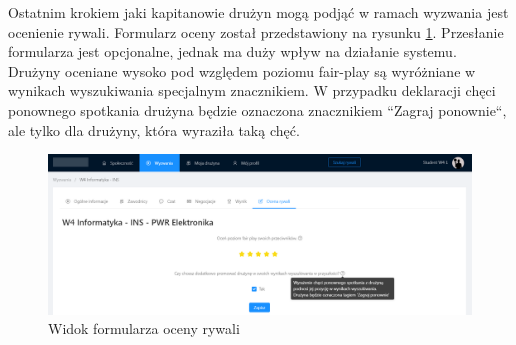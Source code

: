 Ostatnim krokiem jaki kapitanowie drużyn mogą podjąć w ramach wyzwania jest ocenienie rywali. Formularz oceny został przedstawiony na rysunku \ref{fig:ss--match-10}. Przesłanie formularza jest opcjonalne, jednak ma duży wpływ na działanie systemu. Drużyny oceniane wysoko pod względem poziomu fair-play są wyróżniane w wynikach wyszukiwania specjalnym znacznikiem. W przypadku deklaracji chęci ponownego spotkania drużyna będzie oznaczona znacznikiem ``Zagraj ponownie``, ale tylko dla drużyny, która wyraziła taką chęć.

\begin{figure}[H]
\centering
\includegraphics[width=\linewidth]{065-dzialanie/rys/ss-match-10.PNG}
\caption{Widok formularza oceny rywali}
\label{fig:ss--match-10}
\end{figure}
